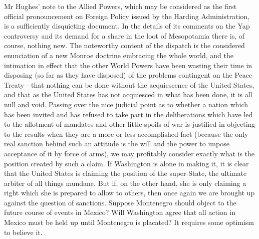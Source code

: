\documentclass{book}
\begin{document}
Mr Hughes’ note to the Allied Powers, which may be considered as the first official pronouncement on Foreign Policy issued by the Harding Administration, is a sufficiently disquieting document. In the details of its comments on the Yap controversy and its demand for a share in the loot of Mesopotamia there is, of course, nothing new. The noteworthy content of the dispatch is the considered enunciation of a new Monroe doctrine embracing the whole world, and the intimation in effect that the other World Powers have been wasting their time in disposing (so far as they have disposed) of the problems contingent on the Peace Treaty—that nothing can be done without the acquiescence of the United States, and that as the United States has not acquiesced in what has been done, it is all null and void. Passing over the nice judicial point as to whether a nation which has been invited and has refused to take part in the deliberations which have led to the allotment of mandates and other little spoils of war is justified in objecting to the results when they are a more or less accomplished fact (because the only real sanction behind such an attitude is the will and the power to impose acceptance of it by force of arms), we may profitably consider exactly what is the position created by such a claim. If Washington is alone in making it, it is clear that the United States is claiming the position of the super-State, the ultimate arbiter of all things mundane. But if, on the other hand, she is only claiming a right which she is prepared to allow to others, then once again we are brought up against the question of sanctions. Suppose Montenegro should object to the future course of events in Mexico? Will Washington agree that all action in Mexico must be held up until Montenegro is placated? It requires some optimism to believe it.
\end{document}
